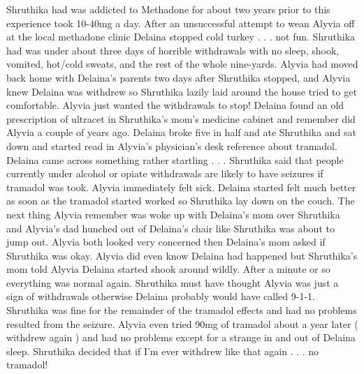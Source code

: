 \documentclass[12pt]{book}
\begin{document}
Shruthika had was addicted to Methadone for about two years prior to this experience took 10-40mg a day. After an unsuccessful attempt to wean Alyvia off at the local methadone clinic Delaina stopped cold turkey . . .  not fun. Shruthika had was under about three days of horrible withdrawals with no sleep, shook, vomited, hot/cold sweats, and the rest of the whole nine-yards. Alyvia had moved back home with Delaina's parents two days after Shruthika stopped, and Alyvia knew Delaina was withdrew so Shruthika lazily laid around the house tried to get comfortable. Alyvia just wanted the withdrawals to stop! Delaina found an old prescription of ultracet in Shruthika's mom's medicine cabinet and remember did Alyvia a couple of years ago. Delaina broke five in half and ate Shruthika and sat down and started read in Alyvia's physician's desk reference about tramadol. Delaina came across something rather startling . . .  Shruthika said that people currently under alcohol or opiate withdrawals are likely to have seizures if tramadol was took. Alyvia immediately felt sick. Delaina started felt much better as soon as the tramadol started worked so Shruthika lay down on the couch. The next thing Alyvia remember was woke up with Delaina's mom over Shruthika and Alyvia's dad hunched out of Delaina's chair like Shruthika was about to jump out. Alyvia both looked very concerned then Delaina's mom asked if Shruthika was okay. Alyvia did even know Delaina had happened but Shruthika's mom told Alyvia Delaina started shook around wildly. After a minute or so everything was normal again. Shruthika must have thought Alyvia was just a sign of withdrawals otherwise Delaina probably would have called 9-1-1. Shruthika was fine for the remainder of the tramadol effects and had no problems resulted from the seizure. Alyvia even tried 90mg of tramadol about a year later ( withdrew again ) and had no problems except for a strange in and out of Delaina sleep. Shruthika decided that if I'm ever withdrew like that again . . .  no tramadol!
\end{document}
